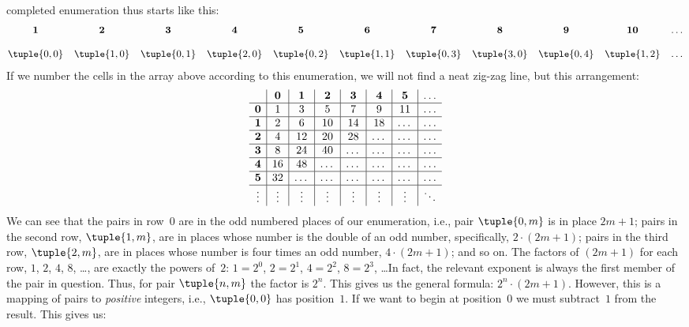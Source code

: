 \begin{explain}
completed enumeration thus starts like this:
\[\small
\begin{array}{@{}cc c c c c c c c c c@{}}
\mathbf 1 & \mathbf 2 & \mathbf 3 & \mathbf 4 & \mathbf 5 & \mathbf 6 & \mathbf 7 & \mathbf 8 & \mathbf 9 & \mathbf{10} & \dots \\ \\
\tuple{0,0} & \tuple{1,0} & \tuple{0,1} & \tuple{2,0}  & \tuple{0,2} & 
\tuple{1,1} & \tuple{0,3} & \tuple{3,0}  & \tuple{0,4} &  \tuple{1,2} & \dots \\
\end{array}
\]
If we number the cells in the array above according to this
enumeration, we will not find a neat zig-zag line, but this
arrangement:
\[
\begin{array}{ c | c | c | c | c | c | c | c }
& \mathbf 0 & \mathbf 1 & \mathbf 2 & \mathbf 3 & \mathbf 4 & \mathbf 5 & \dots \\
\hline
\mathbf 0 & 1 & 3 & 5 & 7 & 9 & 11 & \dots \\
\hline
\mathbf 1 & 2 & 6 & 10 & 14 & 18 & \dots & \dots \\
\hline
\mathbf 2 & 4 & 12 & 20 & 28 & \dots & \dots & \dots \\
\hline
\mathbf 3 & 8 & 24 & 40 & \dots & \dots & \dots & \dots \\
\hline
\mathbf 4 & 16 & 48 & \dots & \dots & \dots & \dots & \dots \\
\hline
\mathbf 5 & 32 & \dots & \dots & \dots & \dots & \dots & \dots \\
\hline
\vdots & \vdots & \vdots & \vdots & \vdots & \vdots & \vdots & \ddots\\
\end{array}
\]
We can see that the pairs in row~$0$ are in the odd numbered places of
our enumeration, i.e., pair $\tuple{0,m}$ is in place $2m+1$; pairs in
the second row, $\tuple{1,m}$, are in places whose number is the
double of an odd number, specifically,  $2 \cdot (2m+1)$; pairs in the
third row, $\tuple{2,m}$, are in places whose number is four times an
odd number, $4 \cdot (2m+1)$; and so on. The factors of $(2m+1)$ for
each row, $1$, $2$, $4$, $8$, \dots, are exactly the powers of~$2$:
$1= 2^0$, $2 = 2^1$, $4 = 2^2$, $8 = 2^3$, \dots\@ In fact, the
relevant exponent is always the first member of the pair in
question. Thus, for pair $\tuple{n,m}$ the factor is $2^n$.  This
gives us the general formula: $2^n \cdot (2m+1)$. However, this is a
mapping of pairs to \emph{positive} integers, i.e., $\tuple{0,0}$ has
position~$1$. If we want to begin at position~$0$ we must subtract~$1$
from the result. This gives us:
\end{explain}

